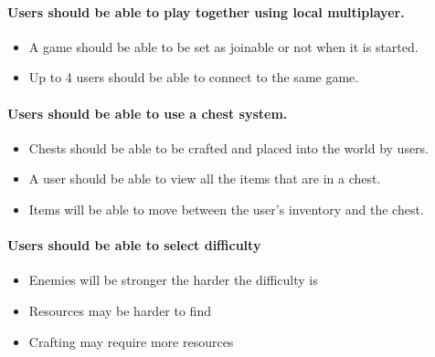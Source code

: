 \documentclass{article}
\begin{document}
\paragraph{Users should be able to play together using local multiplayer.}
\begin{itemize}
	\item A game should be able to be set as joinable or not when it is started.
	\item Up to 4 users should be able to connect to the same game.
\end{itemize}

\paragraph{Users should be able to use a chest system.}
\begin{itemize}
	\item Chests should be able to be crafted and placed into the world by users.
	\item A user should be able to view all the items that are in a chest.
	\item Items will be able to move between the user's inventory and the chest.
\end{itemize}

\paragraph{Users should be able to select difficulty}
\begin{itemize}
	\item Enemies will be stronger the harder the difficulty is
	\item Resources may be harder to find
	\item Crafting may require more resources
\end{itemize}
\end{document}
